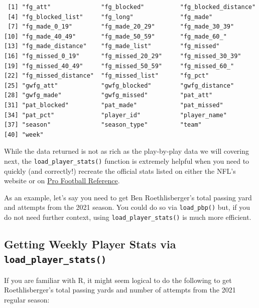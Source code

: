 \documentclass[
  letterpaper,
]{krantz}
\begin{document}
\begin{verbatim}
 [1] "fg_att"              "fg_blocked"          "fg_blocked_distance"
 [4] "fg_blocked_list"     "fg_long"             "fg_made"            
 [7] "fg_made_0_19"        "fg_made_20_29"       "fg_made_30_39"      
[10] "fg_made_40_49"       "fg_made_50_59"       "fg_made_60_"        
[13] "fg_made_distance"    "fg_made_list"        "fg_missed"          
[16] "fg_missed_0_19"      "fg_missed_20_29"     "fg_missed_30_39"    
[19] "fg_missed_40_49"     "fg_missed_50_59"     "fg_missed_60_"      
[22] "fg_missed_distance"  "fg_missed_list"      "fg_pct"             
[25] "gwfg_att"            "gwfg_blocked"        "gwfg_distance"      
[28] "gwfg_made"           "gwfg_missed"         "pat_att"            
[31] "pat_blocked"         "pat_made"            "pat_missed"         
[34] "pat_pct"             "player_id"           "player_name"        
[37] "season"              "season_type"         "team"               
[40] "week"               
\end{verbatim}

While the data returned is not as rich as the play-by-play data we will
covering next, the \texttt{load\_player\_stats()} function is extremely
helpful when you need to quickly (and correctly!) recreate the official
stats listed on either the NFL's website or on
\href{https://www.pro-football-reference.com/}{Pro Football Reference}.

As an example, let's say you need to get Ben Roethlisberger's total
passing yard and attempts from the 2021 season. You could do so via
\texttt{load\_pbp()} but, if you do not need further context, using
\texttt{load\_player\_stats()} is much more efficient.

\hypertarget{getting-weekly-player-stats-via-load_player_stats}{%
\subsection{\texorpdfstring{Getting Weekly Player Stats via
\texttt{load\_player\_stats()}}{Getting Weekly Player Stats via load\_player\_stats()}}\label{getting-weekly-player-stats-via-load_player_stats}}

If you are familiar with R, it might seem logical to do the following to
get Roethlisberger's total passing yards and number of attempts from the
2021 regular season:
\end{document}
